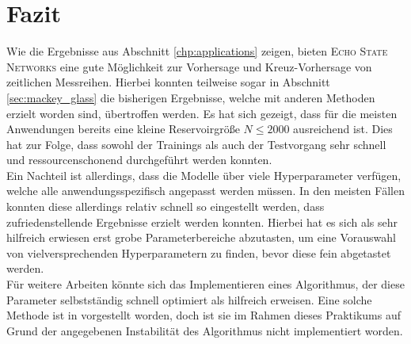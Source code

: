 \section{Fazit}
Wie die Ergebnisse aus Abschnitt \ref{chp:applications} zeigen, bieten \textsc{Echo State Networks} eine gute Möglichkeit zur Vorhersage und Kreuz-Vorhersage von zeitlichen Messreihen. Hierbei konnten teilweise sogar in Abschnitt \ref{sec:mackey_glass} die bisherigen Ergebnisse, welche mit anderen Methoden erzielt worden sind, übertroffen werden. Es hat sich gezeigt, dass für die meisten Anwendungen bereits eine kleine Reservoirgröße $N \leq 2000$ ausreichend ist. Dies hat zur Folge, dass sowohl der Trainings als auch der Testvorgang sehr schnell und ressourcenschonend durchgeführt werden konnten.\\

Ein Nachteil ist allerdings, dass die Modelle über viele Hyperparameter verfügen, welche alle anwendungsspezifisch angepasst werden müssen. In den meisten Fällen konnten diese allerdings relativ schnell so eingestellt werden, dass zufriedenstellende Ergebnisse erzielt werden konnten. Hierbei hat es sich als sehr hilfreich erwiesen erst grobe Parameterbereiche abzutasten, um eine Vorauswahl von vielversprechenden Hyperparametern zu finden, bevor diese fein abgetastet werden.\\
Für weitere Arbeiten könnte sich das Implementieren eines Algorithmus, der diese Parameter selbstständig schnell optimiert als hilfreich erweisen. Eine solche Methode ist in \citep{jaeger2007} vorgestellt worden, doch ist sie im Rahmen dieses Praktikums auf Grund der angegebenen Instabilität des Algorithmus nicht implementiert worden.
